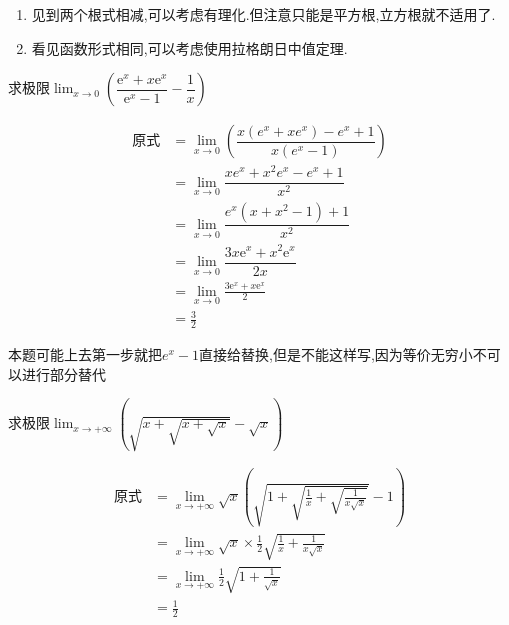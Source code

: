 \documentclass[8pt a4paper, oneside, UTF8]{ctexbook}
\begin{document}
\begin{sloppypar}
\begin{enumerate}
        \item 见到两个根式相减,可以考虑有理化.但注意只能是平方根,立方根就不适用了.
        \item 看见函数形式相同,可以考虑使用拉格朗日中值定理.
    \end{enumerate}
    \begin{problem}
    求极限$\lim_{x\to0}\left(\dfrac{\mathrm{e}^x+x\mathrm{e}^x}{\mathrm{e}^x-1}-\dfrac1x\right)$
    \end{problem}
    \begin{solution}
        \begin{align*}
            \text{原式} & =  \lim_{x\to0} (\dfrac{x(e^x+xe^x)-e^x+1}{x(e^x-1)})          \\
                      & = \lim_{x\to0} \dfrac{xe^x+x^2e^x-e^x+1}{x^2}                  \\
                      & = \lim_{x\to0} \dfrac{e^x(x+x^2-1)+1}{x^2}                     \\
                      & = \lim_{x\to0}\dfrac{3x\mathrm{e}^{x}+x^{2}\mathrm{e}^{x}}{2x} \\
                      & =\lim_{x\to0}\frac{3\mathrm{e}^{x}+x\mathrm{e}^{x}}{2}         \\
                      & =\frac{3}{2}
        \end{align*}
    \end{solution}
    \begin{note}
        本题可能上去第一步就把$e^x-1$直接给替换,但是不能这样写,因为等价无穷小不可以进行部分替代
    \end{note}
    \begin{problem}
    求极限$\lim_{x\to+\infty}(\sqrt{x+\sqrt{x+\sqrt{x}}}-\sqrt{x})$
    \end{problem}
    \begin{solution}
        \begin{align*}
            \text{原式} & = \lim_{x\to+\infty}\sqrt{x}(\sqrt{1+\sqrt{\frac{1}{x}+\sqrt{\frac{1}{x\sqrt{x}}}}}-1) \\
                      & = \lim_{x\to+\infty} \sqrt{x}\times \frac{1}{2}\sqrt{\frac{1}{x}+\frac{1}{x\sqrt{x}}}  \\
                      & = \lim_{x\to+\infty} \frac{1}{2}\sqrt{1+\frac{1}{\sqrt{x}}}                            \\
                      & = \frac{1}{2}
        \end{align*}
    \end{solution}
    \begin{note}

\end{note}
\end{sloppypar}
\end{document}

